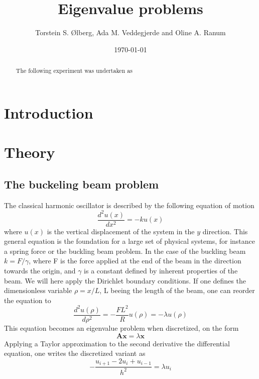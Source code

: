 \documentclass[%
reprint,
amsmath,amssymb,
aps,
]{revtex4-1}
\begin{document}
\title{Eigenvalue problems}
\author{Torstein S. Ølberg, Ada M. Veddegjerde and Oline A. Ranum}
\date{\today}


\begin{abstract}
	The following experiment was undertaken as
\end{abstract}
\maketitle

\section*{Introduction}


\section*{Theory}


\subsection{The buckeling beam problem} \noindent 
The classical harmonic oscillator is described by the following equation of motion
\begin{equation}\label{evp}
 \frac{d^2 u(x)}{dx^2} = -k u(x)
\end{equation}
where $u(x)$ is the vertical displacement of the system in the $y$ direction. This general equation is the foundation for a large set of physical systems, for instance a spring force or the buckling beam problem. In the case of the buckling beam $k = F/\gamma$, where F is the force applied at the end of the beam in the direction towards the origin, and $\gamma$ is a constant defined by inherent properties of the beam. We will here apply the Dirichlet boundary conditions. If one defines the dimensionless variable $\rho = x/L$, L beeing the length of the beam, one can reorder the equation to
\begin{equation*}
	 \frac{d^2 u(\rho)}{d\rho^2} = -\frac{FL^2}{R} u(\rho)=-\lambda u(\rho)
\end{equation*}
This equation becomes an eigenvalue problem when discretized, on the form 
\begin{equation*}
\mathbf{A}\mathbf{x} = \lambda\mathbf{x}
\end{equation*}
Applying a Taylor approximation to the second derivative the differential equation, one writes the discretized variant as 
\begin{equation}\label{eqdis}
	-\frac{u_{i+1} -2u_i +u_{i-1} }{h^2}  = \lambda u_i
\end{equation}
\end{document}
